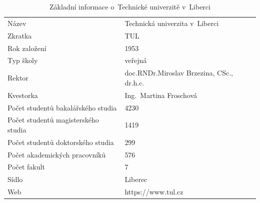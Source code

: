 \documentclass[a4paper,11pt,fonts,numbering,twoside,margins,listingsleft]{./tulpackage/tulthesis}
\begin{document}
\begin{table}[H]
    \caption{Základní informace o~Technické univerzitě v~Liberci}\label{tab:zakladni_informace}
    \small
    \begin{tabular}{ll}
        \midrule
        Název                               & Technická univerzita v~Liberci                                      \\
        Zkratka                             & TUL                                                                 \\
        Rok založení                        & 1953                                                                \\
        Typ školy                           & veřejná                                                             \\
        Rektor                              & doc.\thinspace{}RNDr.\thinspace{}Miroslav Brzezina, CSc., dr.\thinspace{}h.\thinspace{}c. \\ %
        Kvestorka                           & Ing.~Martina Froschová                                                                    \\
        Počet studentů bakalářského studia  & 4230                                                                \\
        Počet studentů magisterského studia & 1419                                                                \\
        Počet studentů doktorského studia   & 299                                                                 \\
        Počet akademických pracovníků       & 576                                                                 \\
        Počet fakult                        & 7                                                                   \\
        Sídlo                               & Liberec                                                             \\
        Web                                 & https://www.tul.cz                                                  \\
        \bottomrule
    \end{tabular}
\end{table}
\vspace{0.8em}
\end{document}
